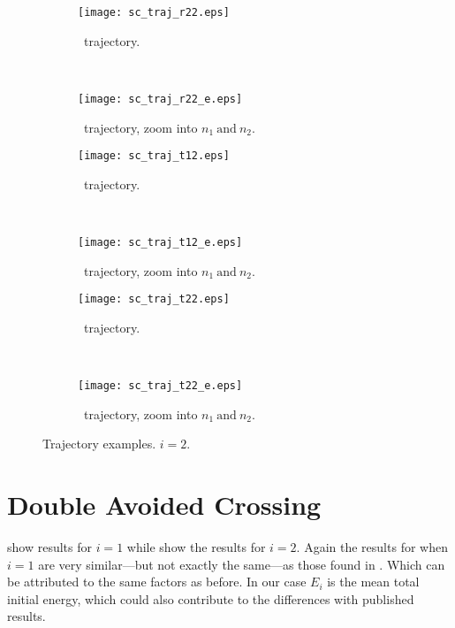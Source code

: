 \begin{figure}
\begin{subfigure}[t]{0.5\textwidth}
\centering
\texttt{[image: sc\_traj\_r22.eps]}
\caption[Single avoided crossing: \rtt~trajectory.]{\rtt~trajectory.}
\label{sf:scr22}
\end{subfigure}
~
\begin{subfigure}[t]{0.5\textwidth}
\centering
\texttt{[image: sc\_traj\_r22\_e.eps]}
\caption[Single avoided crossing: \rtt~trajectory, zoom into $ n_{1}~\text{and}~n_{2} $.]{\rtt~trajectory, zoom into $ n_{1}~\text{and}~n_{2} $.}
\label{sf:scr22e}
\end{subfigure}

\begin{subfigure}[t]{0.5\textwidth}
\centering
\texttt{[image: sc\_traj\_t12.eps]}
\caption[Single avoided crossing: \tot~trajectory.]{\tot~trajectory.}
\label{sf:sct12}
\end{subfigure}
~
\begin{subfigure}[t]{0.5\textwidth}
\centering
\texttt{[image: sc\_traj\_t12\_e.eps]}
\caption[Single avoided crossing: \tot~trajectory, zoom into $ n_{1}~\text{and}~n_{2} $.]{\tot~trajectory, zoom into $ n_{1}~\text{and}~n_{2} $.}
\label{sf:sct12e}
\end{subfigure}

\begin{subfigure}[t]{0.5\textwidth}
\centering
\texttt{[image: sc\_traj\_t22.eps]}
\caption[Single avoided crossing: \ttt~trajectory.]{\ttt~trajectory.}
\label{sf:sct22}
\end{subfigure}
~
\begin{subfigure}[t]{0.5\textwidth}
\centering
\texttt{[image: sc\_traj\_t22\_e.eps]}
\caption[Single avoided crossing: \ttt~trajectory, zoom into $ n_{1}~\text{and}~n_{2} $.]{\ttt~trajectory, zoom into $ n_{1}~\text{and}~n_{2} $.}
\label{sf:sct22e}
\end{subfigure}
\caption[Single avoided crossing: trajectory examples. $ i = 2 $.]{Trajectory examples. $ i = 2 $.}
\label{f:sc2t}
\end{figure}
%
\section{Double Avoided Crossing}\label{s:rdac}
%
 show results for $ i = 1 $ while  show the results for $ i = 2 $. Again the results for when $ i = 1 $ are very similar---but not exactly the same---as those found in \cite{project}. Which can be attributed to the same factors as before. In our case $ E_{i} $ is the mean total initial energy, which could also contribute to the differences with published results.

